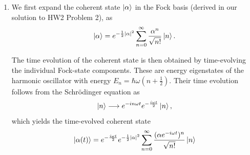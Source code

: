 \documentclass[12pt]{article}
\begin{document}
\begin{appendices}
\begin{enumerate}[label=\alph*)]
\item %

We first expand the coherent state $\ket{\alpha}$ in the Fock basis (derived in our solution to HW2 Problem 2), as
\begin{equation}
    \ket{\alpha} = e^{-\frac{1}{2}|\alpha|^2} \sum_{n=0}^{\infty} \frac{\alpha^n}{\sqrt{n!}} \ket{n}.
    \label{eq:coherent-state}
\end{equation}

The time evolution of the coherent state is then obtained by time-evolving the individual Fock-state components. These are energy eigenstates of the harmonic oscillator with energy $E_n = \hbar\omega (n+\frac{1}{2})$. Their time evolution follows from the Schr\"odinger equation as
\begin{equation}
    \ket{n} \longrightarrow e^{-in\omega t} e^{-\frac{i\omega t}{2}}\ket{n},
\end{equation}
which yields the time-evolved coherent state
\begin{equation}
    \ket{\alpha(t)} =
    e^{-\frac{i\omega t}{2} }
    e^{-\frac{1}{2}|\alpha|^2}
    \sum_{n=0}^{\infty}
    \frac{(\alpha e^{-i\omega t})^n}{\sqrt{n!}} \ket{n}
    \label{eq:coherent-state-time-dependent}
\end{equation}


\end{enumerate}
\end{appendices}
\end{document}
